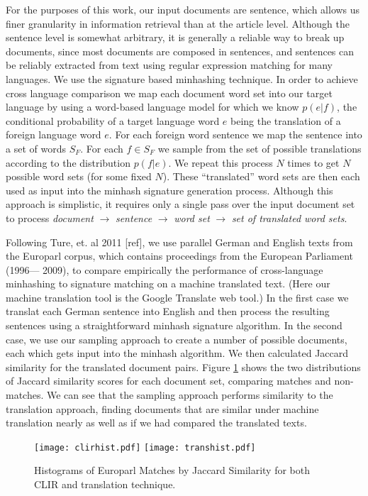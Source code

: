 \documentclass{acm_proc_article-sp}
\begin{document}
For the purposes of this work, our input documents are sentence, which allows us finer granularity in information retrieval than at the article level. Although the sentence level is somewhat arbitrary, it is generally a reliable way to break up documents, since most documents are composed in sentences, and sentences can be reliably extracted from text using regular expression matching for many languages. We use the signature based minhashing technique. In order to achieve cross language comparison we map each document word set into our target language by using a word-based language model for which we know $p(e|f)$, the conditional probability of a target language word $e$ being the translation of a foreign language word $e$. For each foreign word sentence we map the sentence into a set of words $S_F$. For each $f \in S_F$ we sample from the set of possible translations according to the distribution $p(f|e)$. We repeat this process $N$ times to get $N$ possible word sets (for some fixed $N$). These ``translated'' word sets are then each used as input into the minhash signature generation process. Although this approach is simplistic, it requires only a single pass over the input document set to process \emph{document} $\rightarrow$ \emph{sentence} $\rightarrow$ \emph{word set} $\rightarrow$ \emph{set of translated word sets}.

Following Ture, et. al 2011 [ref], we use parallel German and English texts from the Europarl corpus, which contains proceedings from the European Parliament (1996— 2009), to compare empirically the performance of cross-language minhashing to signature matching on a machine translated text. (Here our machine translation tool is the Google Translate web tool.)  In the first case we translat each German sentence into English and then process the resulting sentences using a straightforward minhash signature algorithm. In the second case, we use our sampling approach to create a number of possible documents, each which gets input into the minhash algorithm. We then calculated Jaccard similarity for the translated document pairs. Figure \ref{mtclircompare} shows the two distributions of Jaccard similarity scores for each document set, comparing matches and non-matches. We can see that the sampling approach performs similarity to the translation approach, finding documents that are similar under machine translation nearly as well as if we had compared the translated texts.

\begin{figure}
\centering
\texttt{[image: clirhist.pdf]}
\texttt{[image: transhist.pdf]}
\caption{Histograms of Europarl Matches by Jaccard Similarity for both CLIR and translation technique.}
\label{mtclircompare}
\end{figure}
\end{document}
